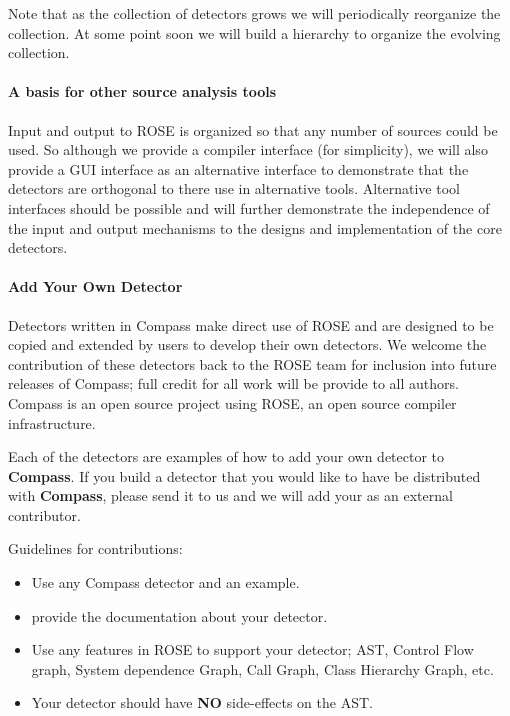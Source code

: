    Note that as the collection of detectors grows we will periodically reorganize the 
collection.  At some point soon we will build a hierarchy to organize the evolving
collection.

\paragraph{A basis for other source analysis tools}
   Input and output to ROSE is organized so that any number of sources could be used.
So although we provide a compiler interface (for simplicity), we will also provide a 
GUI interface as an alternative interface to demonstrate that the detectors are orthogonal
to there use in alternative tools.  Alternative tool interfaces should be possible 
and will further demonstrate the independence of the input and output mechanisms to
the designs and implementation of the core detectors.

\paragraph{Add Your Own Detector}

    Detectors written in Compass make direct use of ROSE and are 
designed to be copied and extended by users to develop their own 
detectors. We welcome the contribution of these detectors back to 
the ROSE team for inclusion into future releases of Compass;
full credit for all work will be provide to all authors.
Compass is an open source project using ROSE, an open source
compiler infrastructure.

    Each of the detectors are examples of how to
add your own detector to {\bf Compass}.  If you
build a detector that you would like to have be 
distributed with {\bf Compass}, please send it to
us and we will add your as an external contributor.

  Guidelines for contributions:
\begin{itemize}
   \item Use any Compass detector and an example.
   \item provide the documentation about your detector.
   \item Use any features in ROSE to support your detector; AST, Control Flow graph,
    System dependence Graph, Call Graph, Class Hierarchy Graph, etc.
   \item Your detector should have {\bf NO} side-effects on the AST.
\end{itemize}





